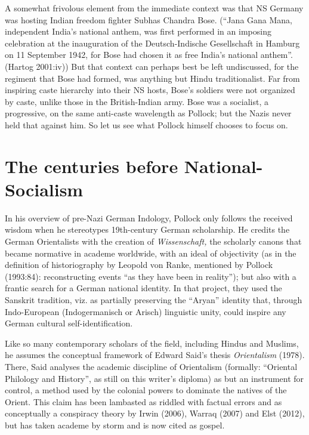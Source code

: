 A somewhat frivolous element from the immediate context was that NS Germany was hosting Indian freedom fighter Subhas Chandra Bose. (“Jana Gana Mana, independent India’s national anthem, was first performed in an imposing celebration at the inauguration of the Deutsch-Indische Gesellschaft in Hamburg on 11 September 1942, for Bose had chosen it as free India’s national anthem”. (Hartog 2001:iv))  But that context can perhaps best be left undiscussed, for the regiment that Bose had formed, was anything but Hindu traditionalist. Far from inspiring caste hierarchy into their NS hosts, Bose’s soldiers were not organized by caste, unlike those in the British-Indian army. Bose was a socialist, a progressive, on the same anti-caste wavelength as Pollock; but the Nazis never held that against him. So let us see what Pollock himself chooses to focus on.

\section*{The centuries before National-Socialism}

In his overview of pre-Nazi German Indology, Pollock only follows the received wisdom when he stereotypes 19th-century German scholarship. He credits the German Orientalists with the creation of {\sl Wissenschaft,} the scholarly canons that became normative in academe worldwide, with an ideal of objectivity (as in the definition of historiography by Leopold von Ranke, mentioned by Pollock (1993:84): reconstructing events “as they have been in reality”); but also with a frantic search for a German national identity. In that project, they used the Sanskrit tradition, viz. as partially preserving the “Aryan” identity that, through Indo-European (Indogermanisch or Arisch) linguistic unity, could inspire any German cultural self-identification.

Like so many contemporary scholars of the field, including Hindus and Muslims, he assumes the conceptual framework of Edward Said’s thesis {\sl Orientalism} (1978). There, Said analyses the academic discipline of Orientalism (formally: “Oriental Philology and History”, as still on this writer’s diploma) as but an instrument for control, a method used by the colonial powers to dominate the natives of the Orient. This claim has been lambasted as riddled with factual errors and as conceptually a conspiracy theory by Irwin (2006), Warraq (2007) and Elst (2012), but has taken academe by storm and is now cited as gospel.

